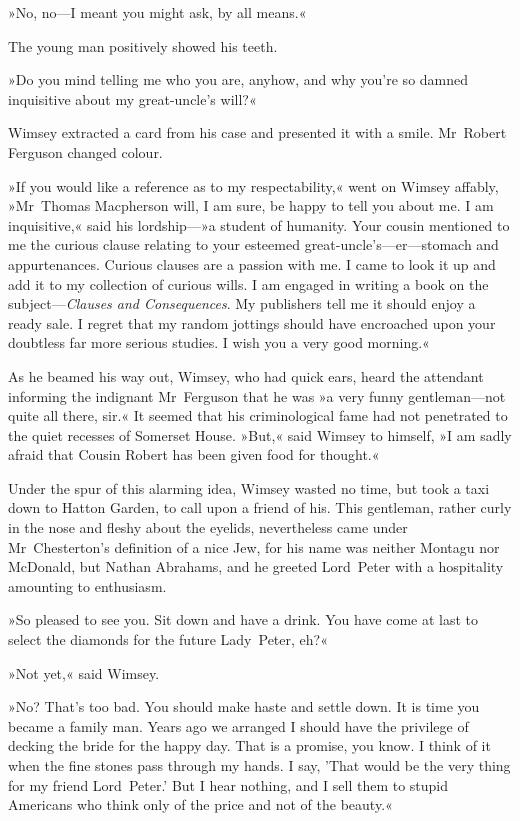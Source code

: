 »No, no—I meant you might ask, by all means.«

The young man positively showed his teeth.

»Do you mind telling me who you are, anyhow, and why you're so damned inquisitive about my great-uncle's will?«

Wimsey extracted a card from his case and presented it with a smile. Mr~Robert Ferguson changed colour.

»If you would like a reference as to my respectability,« went on Wimsey affably, »Mr~Thomas Macpherson will, I am sure, be happy to tell you about me. I am inquisitive,« said his lordship—»a student of humanity. Your cousin mentioned to me the curious clause relating to your esteemed great-uncle's—er—stomach and appurtenances. Curious clauses are a passion with me. I came to look it up and add it to my collection of curious wills. I am engaged in writing a book on the subject—\textit{Clauses and Consequences}. My publishers tell me it should enjoy a ready sale. I regret that my random jottings should have encroached upon your doubtless far more serious studies. I wish you a very good morning.«

As he beamed his way out, Wimsey, who had quick ears, heard the attendant informing the indignant Mr~Ferguson that he was »a very funny gentleman—not quite all there, sir.« It seemed that his criminological fame had not penetrated to the quiet recesses of Somerset House. »But,« said Wimsey to himself, »I am sadly afraid that Cousin Robert has been given food for thought.«

Under the spur of this alarming idea, Wimsey wasted no time, but took a taxi down to Hatton Garden, to call upon a friend of his. This gentleman, rather curly in the nose and fleshy about the eyelids, nevertheless came under Mr~Chesterton's definition of a nice Jew, for his name was neither Montagu nor McDonald, but Nathan Abrahams, and he greeted Lord~Peter with a hospitality amounting to enthusiasm.

»So pleased to see you. Sit down and have a drink. You have come at last to select the diamonds for the future Lady~Peter, eh?«

»Not yet,« said Wimsey.

»No? That's too bad. You should make haste and settle down. It is time you became a family man. Years ago we arranged I should have the privilege of decking the bride for the happy day. That is a promise, you know. I think of it when the fine stones pass through my hands. I say, 'That would be the very thing for my friend Lord~Peter.' But I hear nothing, and I sell them to stupid Americans who think only of the price and not of the beauty.«

